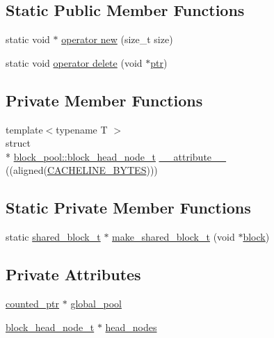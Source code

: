 \subsection*{Static Public Member Functions}
\begin{DoxyCompactItemize}
\item 
static void $\ast$ \hyperlink{classblock__pool_a08b4e73a9dfc28489c291966d74138ae}{operator new} (size\-\_\-t size)
\item 
static void \hyperlink{classblock__pool_adc061bb0288867e16891ce4eeeb4aa4f}{operator delete} (void $\ast$\hyperlink{counted__ptr_8hpp_ac0fd97c9323e3a3981515b00166f14d8}{ptr})
\end{DoxyCompactItemize}
\subsection*{Private Member Functions}
\begin{DoxyCompactItemize}
\item 
{\footnotesize template$<$typename T $>$ }\\struct \\*
\hyperlink{structblock__pool_1_1block__head__node__t}{block\-\_\-pool\-::block\-\_\-head\-\_\-node\-\_\-t} \hyperlink{classblock__pool_aaf3250113e082fccf73953fbf31292ea}{\-\_\-\-\_\-attribute\-\_\-\-\_\-} ((aligned(\hyperlink{platform_8hpp_a4538b5ec4a295a2b8a52560e61575041}{C\-A\-C\-H\-E\-L\-I\-N\-E\-\_\-\-B\-Y\-T\-E\-S})))
\end{DoxyCompactItemize}
\subsection*{Static Private Member Functions}
\begin{DoxyCompactItemize}
\item 
static \hyperlink{structblock__pool_1_1shared__block__t}{shared\-\_\-block\-\_\-t} $\ast$ \hyperlink{classblock__pool_a1af804f5ae32798163e68dca39418c77}{make\-\_\-shared\-\_\-block\-\_\-t} (void $\ast$\hyperlink{structblock}{block})
\end{DoxyCompactItemize}
\subsection*{Private Attributes}
\begin{DoxyCompactItemize}
\item 
\hyperlink{unioncounted__ptr}{counted\-\_\-ptr} $\ast$ \hyperlink{classblock__pool_af780642743ad9cc26764304a8d1c4d62}{global\-\_\-pool}
\item 
\hyperlink{structblock__pool_1_1block__head__node__t}{block\-\_\-head\-\_\-node\-\_\-t} $\ast$ \hyperlink{classblock__pool_a2889af47f657f2b2281c1fdbaaa8016a}{head\-\_\-nodes}
\end{DoxyCompactItemize}
